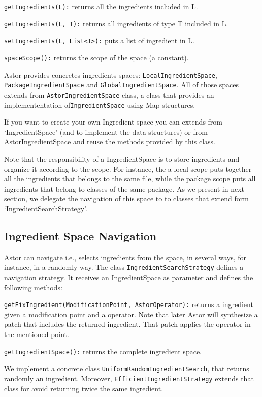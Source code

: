 \documentclass{article}
\begin{document}
{\tt getIngredients(L):} returns all the ingredients included in L.

{\tt getIngredients(L, T):} returns all ingredients of type T included in L.

{\tt setIngredients(L, List<I>):} puts a list of ingredient in L.
	

{\tt spaceScope():} returns the scope of the space (a constant). 

Astor provides concretes ingredients spaces: 
{\tt LocalIngredientSpace}, {\tt PackageIngredientSpace} and {\tt GlobalIngredientSpace}.
All of those spaces extends from {\tt AstorIngredientSpace} class, a class that provides an implemententation of{\tt IngredientSpace} using  Map structures.


If you want to create your own Ingredient space you can extends from `IngredientSpace' (and to implement the data structures) or from AstorIngredientSpace and reuse the methods provided by this class.

Note that the responsibility of a IngredientSpace is to store ingredients and organize it according to the scope. For instance, the a local scope puts together all the ingredients that belongs to the same file, while the package scope puts all ingredients that belong to classes of the same package.
As we present in next section, we delegate the navigation of this space to  to classes that extend form `IngredientSearchStrategy'.  

\subsection{Ingredient Space Navigation}

Astor can navigate i.e., selects ingredients from the space, in several ways, for instance, in a randomly way.
The class {\tt IngredientSearchStrategy} defines a navigation strategy. It receives an IngredientSpace as parameter and defines the following methods:

{\tt getFixIngredient(ModificationPoint, AstorOperator):} returns a ingredient given a modification point and a operator. Note that later Astor will synthesize a patch that includes the returned ingredient. That patch applies the operator in the mentioned point. 

{\tt getIngredientSpace():} returns the complete ingredient space.

We implement a concrete class {\tt UniformRandomIngredientSearch}, that  returns randomly an ingredient. Moreover, {\tt EfficientIngredientStrategy} extends that class for avoid returning twice the same ingredient.
\end{document}
